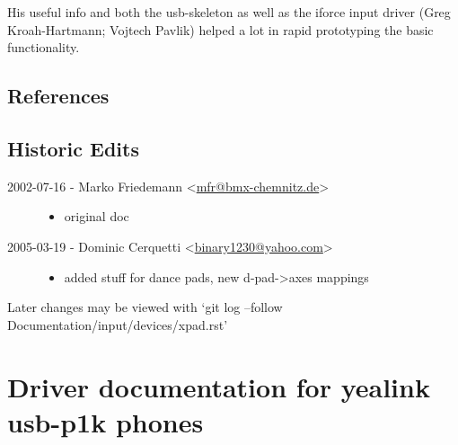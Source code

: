 \documentclass[a4paper,8pt,english]{sphinxmanual}
\begin{document}
His useful info and both the usb-skeleton as well as the iforce input driver
(Greg Kroah-Hartmann; Vojtech Pavlik) helped a lot in rapid prototyping
the basic functionality.


\subsection{References}
\label{input/devices/xpad:references}

\subsection{Historic Edits}
\label{input/devices/xpad:historic-edits}\begin{description}
\item[{2002-07-16 - Marko Friedemann \textless{}\href{mailto:mfr@bmx-chemnitz.de}{mfr@bmx-chemnitz.de}\textgreater{}}] \leavevmode\begin{itemize}
\item {} 
original doc

\end{itemize}

\item[{2005-03-19 - Dominic Cerquetti \textless{}\href{mailto:binary1230@yahoo.com}{binary1230@yahoo.com}\textgreater{}}] \leavevmode\begin{itemize}
\item {} 
added stuff for dance pads, new d-pad-\textgreater{}axes mappings

\end{itemize}

\end{description}

Later changes may be viewed with
`git log --follow Documentation/input/devices/xpad.rst'


\section{Driver documentation for yealink usb-p1k phones}
\label{input/devices/yealink:driver-documentation-for-yealink-usb-p1k-phones}\label{input/devices/yealink::doc}
\end{document}
